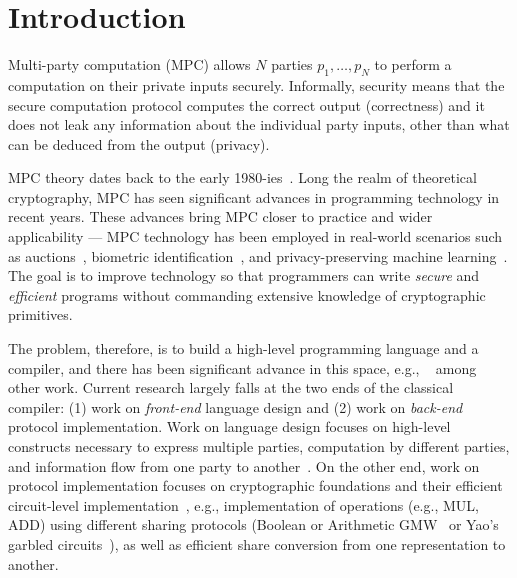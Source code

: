 \section{Introduction}
\label{sec:introduction}

Multi-party computation (MPC) allows $N$ parties $p_1,\dots, p_N$ to perform a computation on their private inputs securely. Informally, security means that the secure computation protocol computes the correct output (correctness) and it does not leak any information about the individual party inputs, other than what can be deduced from the output (privacy).


MPC theory dates back to the early 1980-ies~\cite{Yao:1982,Goldreich:1987,Ben-Or:1988,Chaum:1988}.
Long the realm of theoretical cryptography, MPC has seen significant advances in programming technology in recent years.
These advances bring MPC closer to practice and wider applicability ---
MPC technology has been employed in real-world scenarios such as auctions~\cite{Bogetoft:2009}, biometric identification~\cite{Blanton:2011},
and privacy-preserving machine learning~\cite{Mohassel:2017,Mohassel:2018}.
The goal is to improve technology so that programmers can write \emph{secure} and \emph{efficient} programs without
commanding extensive knowledge of cryptographic primitives.

The problem, therefore, is to build a high-level programming language and a compiler, and there has been significant advance in
this space, e.g., ~\cite{Ben-David:2008,Bogdanov:2008,Zhang:2013,Hastings:2019,Keller:2020,Acay:2021,Braun:2022} among other work.
Current research largely falls at the two ends
of the classical compiler: (1) work on \emph{front-end} language design and (2) work on \emph{back-end} protocol implementation. Work on language design
focuses on high-level constructs necessary to express multiple parties, computation by different parties, and information flow from one party
to another~\cite{Rastogi:2014, Acay:2021}. On the other end, work on protocol implementation focuses on cryptographic foundations and their efficient circuit-level
implementation~\cite{Demmler:2015, Araki:2018, Braun:2022}, e.g., implementation of operations (e.g., MUL, ADD) using different sharing protocols
(Boolean or Arithmetic GMW~\cite{Goldreich:1987} or Yao's garbled circuits~\cite{Yao:1982}), as well as efficient share conversion from one representation
to another.

